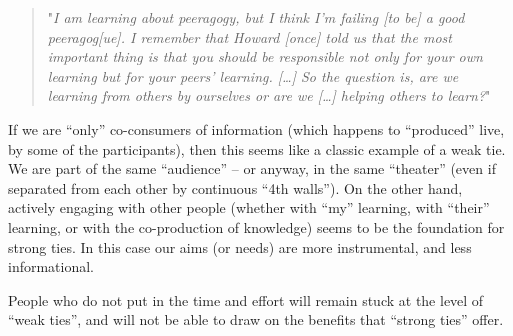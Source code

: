 \begin{quote}
"\emph{I am learning about peeragogy, but I think I'm failing {[}to
be{]} a good peeragog{[}ue{]}. I remember that Howard {[}once{]} told us
that the most important thing is that you should be responsible not only
for your own learning but for your peers' learning. {[}\ldots{}{]} So
the question is, are we learning from others by ourselves or are we
{[}\ldots{}{]} helping others to learn?}"
\end{quote}
If we are ``only'' co-consumers of information (which happens to
``produced'' live, by some of the participants), then this seems like a
classic example of a weak tie. We are part of the same ``audience'' --
or anyway, in the same ``theater'' (even if separated from each other by
continuous ``4th walls''). On the other hand, actively engaging with
other people (whether with ``my'' learning, with ``their'' learning, or
with the co-production of knowledge) seems to be the foundation for
strong ties. In this case our aims (or needs) are more instrumental, and
less informational.

People who do not put in the time and effort will remain stuck at the
level of ``weak ties'', and will not be able to draw on the benefits
that ``strong ties'' offer.
